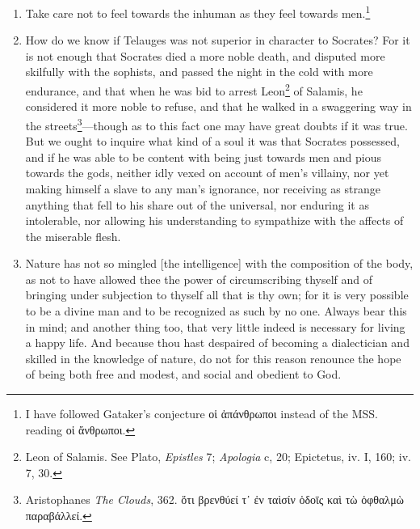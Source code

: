 \begin{enumerate}
\item Take care not to feel towards the inhuman as they feel towards men.\footnote{I have followed Gataker's conjecture \textgreek{οἱ ἀπάνθρωποι} instead of the MSS. reading \textgreek{οἱ ἄνθρωποι}.}

\item How do we know if Telauges was not superior in character to Socrates? For it is not enough that Socrates died a more noble death, and disputed more skilfully with the sophists, and passed the night in the cold with more endurance, and that when he was bid to arrest Leon\footnote{Leon of Salamis. See Plato, \textit{Epistles} 7; \textit{Apologia} c, 20; Epictetus, iv. I, 160; iv. 7, 30.} of Salamis, he considered it more noble to refuse, and that he walked in a swaggering way in the streets\footnote{Aristophanes \textit{The Clouds}, 362. \textgreek{ὅτι βρενθύεί τ᾽ ἐν ταὶσίν ὁδοῑς καὶ τὼ ὀφθαλμὼ παραβάλλεί}.}—though as to this fact one may have great doubts if it was true. But we ought to inquire what kind of a soul it was that Socrates possessed, and if he was able to be content with being just towards men and pious towards the gods, neither idly vexed on account of men's villainy, nor yet making himself a slave to any man's ignorance, nor receiving as strange anything that fell to his share out of the universal, nor enduring it as intolerable, nor allowing his understanding to sympathize with the affects of the miserable flesh.

\item Nature has not so mingled [{\clarify the intelligence}] with the composition of the body, as not to have allowed thee the power of circumscribing thyself and of bringing under subjection to thyself all that is thy own; for it is very possible to be a divine man and to be recognized as such by no one. Always bear this in mind; and another thing too, that very little indeed is necessary for living a happy life. And because thou hast despaired of becoming a dialectician and skilled in the knowledge of nature, do not for this reason renounce the hope of being both free and modest, and social and obedient to God.


\end{enumerate}
